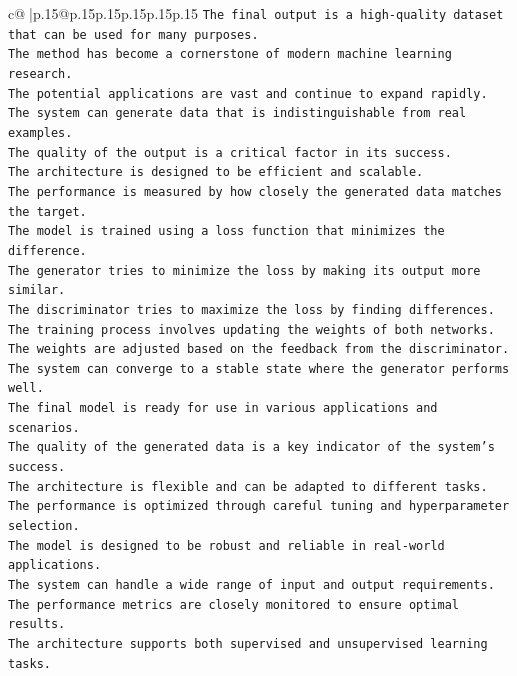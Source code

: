 \documentclass{article}
\begin{document}
{\begin{supertabular}{c@{$\;$}|p{.15\linewidth}@{}p{.15\linewidth}p{.15\linewidth}p{.15\linewidth}p{.15\linewidth}p{.15\linewidth}}
{{{\texttt{The final output is a high{-}quality dataset that can be used for many purposes.  } \\
\texttt{The method has become a cornerstone of modern machine learning research.  } \\
\texttt{The potential applications are vast and continue to expand rapidly.  } \\
\texttt{The system can generate data that is indistinguishable from real examples.  } \\
\texttt{The quality of the output is a critical factor in its success.  } \\
\texttt{The architecture is designed to be efficient and scalable.  } \\
\texttt{The performance is measured by how closely the generated data matches the target.  } \\
\texttt{The model is trained using a loss function that minimizes the difference.  } \\
\texttt{The generator tries to minimize the loss by making its output more similar.  } \\
\texttt{The discriminator tries to maximize the loss by finding differences.  } \\
\texttt{The training process involves updating the weights of both networks.  } \\
\texttt{The weights are adjusted based on the feedback from the discriminator.  } \\
\texttt{The system can converge to a stable state where the generator performs well.  } \\
\texttt{The final model is ready for use in various applications and scenarios.  } \\
\texttt{The quality of the generated data is a key indicator of the system's success.  } \\
\texttt{The architecture is flexible and can be adapted to different tasks.  } \\
\texttt{The performance is optimized through careful tuning and hyperparameter selection.  } \\
\texttt{The model is designed to be robust and reliable in real{-}world applications.  } \\
\texttt{The system can handle a wide range of input and output requirements.  } \\
\texttt{The performance metrics are closely monitored to ensure optimal results.  } \\
\texttt{The architecture supports both supervised and unsupervised learning tasks.  } \\
}}}
\end{supertabular}}
\end{document}

